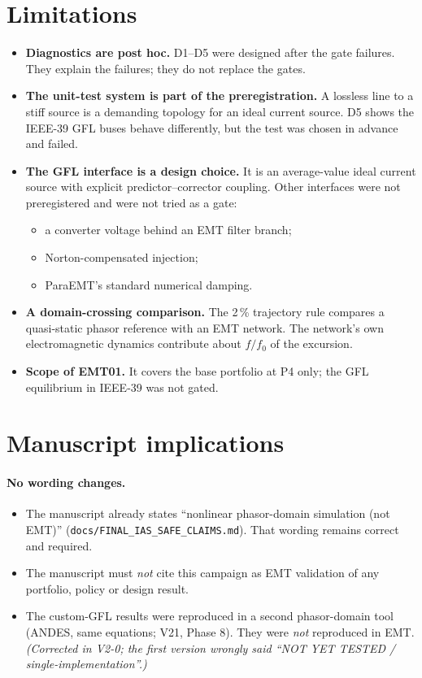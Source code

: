 \documentclass[10pt,a4paper]{article}
\newcommand{\f}[1]{\nolinkurl{#1}}
\begin{document}
\section{Limitations}
\begin{itemize}
\item \textbf{Diagnostics are post hoc.} D1--D5 were designed after the gate
  failures. They explain the failures; they do not replace the gates.
\item \textbf{The unit-test system is part of the preregistration.} A lossless
  line to a stiff source is a demanding topology for an ideal current source.
  D5 shows the IEEE-39 GFL buses behave differently, but the test was chosen
  in advance and failed.
\item \textbf{The GFL interface is a design choice.} It is an average-value
  ideal current source with explicit predictor--corrector coupling. Other
  interfaces were not preregistered and were not tried as a gate:
  \begin{itemize}
  \item a converter voltage behind an EMT filter branch;
  \item Norton-compensated injection;
  \item ParaEMT's standard numerical damping.
  \end{itemize}
\item \textbf{A domain-crossing comparison.} The 2\,\% trajectory rule
  compares a quasi-static phasor reference with an EMT network. The network's
  own electromagnetic dynamics contribute about $f/f_0$ of the excursion.
\item \textbf{Scope of EMT01.} It covers the base portfolio at P4 only; the
  GFL equilibrium in IEEE-39 was not gated.
\end{itemize}

\section{Manuscript implications}

\paragraph{No wording changes.}
\begin{itemize}
\item The manuscript already states ``nonlinear phasor-domain simulation (not
  EMT)'' (\f{docs/FINAL_IAS_SAFE_CLAIMS.md}). That wording remains correct and
  required.
\item The manuscript must \emph{not} cite this campaign as EMT validation of
  any portfolio, policy or design result.
\item The custom-GFL results were reproduced in a second phasor-domain tool
  (ANDES, same equations; V21, Phase 8). They were \emph{not} reproduced in EMT.
  \emph{(Corrected in V2-0; the first version wrongly said ``NOT YET TESTED /
  single-implementation''.)}
\end{itemize}
\end{document}
